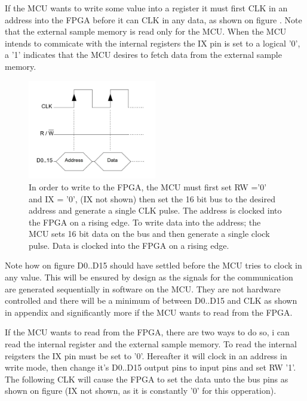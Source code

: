If the MCU wants to write some value into a register it must first CLK in an address into the FPGA before it can CLK in any data, as shown on figure . Note that the external sample memory is read only for the MCU. When the MCU intends to commicate with the internal registers the IX pin is set to a logical '0', a '1' indicates that the MCU desires to fetch data from the external sample memory.
\begin{figure}[H]
    \centering
    \includegraphics[clip, trim=0 50 0 0, width=0.5\textwidth]{Sections/7_SystemDesign/Figures/7_2_1_CommWrite.pdf}
    \caption{In order to write to the FPGA, the MCU must first set RW ='0' and IX = '0', (IX not shown) then set the 16 bit bus to the desired address and generate a single CLK pulse. The address is clocked into the FPGA on a rising edge. To write data into the address; the MCU sets 16 bit data on the bus and then generate a single clock pulse. Data is clocked into the FPGA on a rising edge.}
    \label{fig_7_2_1_CommWrite}
\end{figure}

Note how on figure  D0..D15 should have settled before the MCU tries to clock in any value. This will be ensured by design as the signals for the communication are generated sequentially in software on the MCU. They are not hardware controlled and there will be a minimum of  between D0..D15 and CLK as shown in appendix  and significantly more if the MCU wants to read from the FPGA.

If the MCU wants to read from the FPGA, there are two ways to do so, i can read the internal register and the external sample memory. To read the internal reigsters the IX pin must be set to '0'. Hereafter it will clock in an address in write mode, then change it's D0..D15 output pins to input pins and set RW '1'. The following CLK will cause the FPGA to set the data unto the bus pins as shown on figure  (IX not shown, as it is constantly '0' for this opperation). 

